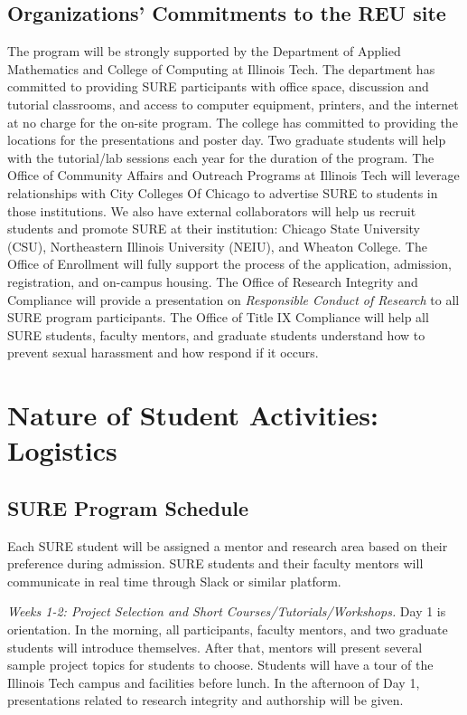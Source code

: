 \documentclass[11pt]{NSFamsart}
\begin{document}
\subsection{Organizations' Commitments to the REU site}
The program will be strongly supported by the Department of Applied Mathematics and College of Computing at Illinois Tech. The department has committed to providing SURE participants with office space, discussion and tutorial classrooms, and access to computer equipment, printers, and the internet at no charge for the on-site program. The college has committed to providing the locations for the presentations and poster day. Two graduate students will help with the tutorial/lab sessions each year for the duration of the program. The Office of Community Affairs and Outreach Programs at Illinois Tech will leverage relationships with City Colleges Of Chicago to
advertise SURE to students in those institutions.
We also have external collaborators will help us recruit students and promote SURE at their institution: Chicago State University (CSU), Northeastern Illinois University (NEIU), and Wheaton College.
The Office of Enrollment will fully support the process of the application, admission, registration, and on-campus housing. 
The Office of Research Integrity and Compliance will provide a presentation on \emph{Responsible Conduct of Research} to all SURE program participants. The Office of Title IX Compliance will help all SURE students, faculty mentors, and graduate students understand how to prevent sexual harassment and how respond if it occurs.


\section{Nature of Student Activities: Logistics}
\subsection{SURE Program Schedule}
\label{sec:SURESchedule}
Each SURE student will be
assigned a mentor and research area based on their preference during admission. SURE students and their faculty
mentors will communicate in real time through Slack or similar platform. 

\noindent \emph{Weeks 1-2: Project Selection and Short Courses/Tutorials/Workshops.}
Day 1 is orientation. In the morning,  all participants, faculty mentors, and two graduate students will introduce themselves. After that, mentors will present several sample project topics for students to choose.
Students will have a tour of the Illinois Tech campus and facilities before lunch. In the afternoon of Day 1,
presentations related to research integrity and authorship will be given.
\end{document}
